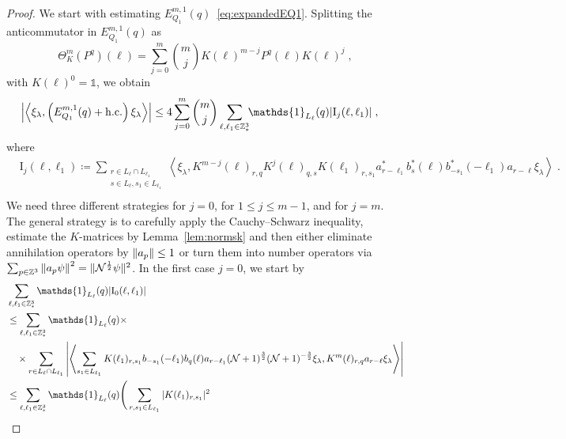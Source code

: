 \documentclass[12pt,a4paper]{article}
\numberwithin{equation}{section}
\newcommand{\cN}{\mathcal{N}}
\newcommand{\1}{\mathbb{I}}
\newcommand{\I}{\mathrm{I}}
\newcommand{\Z}{\mathbb{Z}}
\newcommand{\NN}{\mathcal{N}}
\newcommand{\half}{\frac{1}{2}}
\newcommand{\eva}[1]{\left\langle #1 \right\rangle}
\theoremstyle{plain}
\theoremstyle{definition}
\theoremstyle{remark}
\theoremstyle{plain}
\theoremstyle{definition}
\theoremstyle{remark}
\begin{document}
\begin{proof}
We start with estimating $ E^{m,1}_{Q_1}(q) $~\eqref{eq:expandedEQ1}. Splitting the anticommutator in $ E^{m,1}_{Q_1}(q) $ as
\begin{equation} \label{eq:q-q}
	\Theta^m_K(P^q)(\ell)
	= \sum_{j=0}^m {{m}\choose j} K(\ell)^{m-j} P^q(\ell) K(\ell)^{j} \;,
\end{equation}
with $ K(\ell)^0 = \mathds{1} $, we obtain
\begin{equation} \label{eq:EQ1111}
\begin{aligned}
	& \abs{\eva{\xi_\lambda,\left(E^{m,1}_{Q_1}(q) +  \mathrm{h.c.}\right) \xi_\lambda }}
	\le 4 \sum_{j=0}^m {{m}\choose j} \sum_{\ell,\ell_1  \in \Z^3_*}\!\! \mathds{1}_{L_\ell}(q) | \I_j(\ell, \ell_1)| \;,
	\end{aligned}
\end{equation}
where
\begin{equation}
\begin{aligned}
& 	\I_j(\ell, \ell_1)
	\coloneq \sum_{\substack{r\in L_{\ell} \cap L_{\ell_1}\\ s \in L_{\ell},s_1\in L_{\ell_1}}}
		\eva{\xi_\lambda, K^{m-j}(\ell)_{r,q} K^{j}(\ell)_{q,s} K(\ell_1)_{r,s_1} a^*_{r-\ell_1} b^*_{s}(\ell) b^*_{-s_1}(-\ell_1) a_{r-\ell} \xi_\lambda} \;. \\
\end{aligned}
\end{equation}
We need three different strategies for $ j = 0 $, for $ 1 \le j \le m-1 $, and for $ j = m $. The general strategy is to carefully apply the Cauchy--Schwarz inequality, estimate the $ K $-matrices by Lemma~\ref{lem:normsk} and then either eliminate annihilation operators by $ \norm{a_p} \le 1 $ or turn them into number operators via $ \sum_{p \in \Z^3} \norm{a_p \psi}^2 = \Vert \cN^{\half} \psi \Vert^2 $. In the first case $ j = 0 $, we start by
\begin{align}
	&\sum_{\ell,\ell_1 \in \Z^3_*} \mathds{1}_{L_\ell}(q) |\I_0(\ell, \ell_1)| \nonumber\\
	&\le \sum_{\ell,\ell_1 \in \Z^3_*} \mathds{1}_{L_\ell}(q) \times \nonumber\\
	&\quad \times \sum\limits_{r \in L_\ell \cap L_{\ell_1}} \abs{\eva{ \sum\limits_{s_1 \in L_{\ell_1}} K(\ell_1)_{r,s_1} b_{-s_1}(-\ell_1) b_{q}(\ell) a_{r-\ell_1} (\NN+1)^{\frac 32} (\NN+1)^{-\frac 32} \xi_\lambda, K^{m}(\ell)_{r,q} a_{r-\ell} \xi_\lambda }}\nonumber\\
	&\leq \sum_{\ell,\ell_1 \in \Z^3_*} \mathds{1}_{L_\ell}(q) \Bigg( \sum_{r,s_1 \in L_{\ell_1}} |K(\ell_1)_{r,s_1}|^2

\end{align}
\end{proof}
\end{document}
